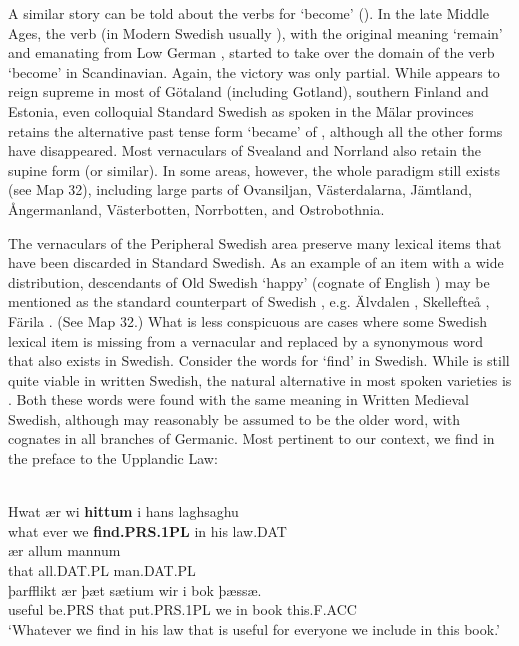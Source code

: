 A similar story can be told about the verbs for ‘become’ (\citet{Markey1969}). In the late Middle Ages, the verb (in Modern Swedish usually ), with the original meaning ‘remain’ and emanating from Low German , started to take over the domain of the verb  ‘become’ in Scandinavian. Again, the victory was only partial. While appears to reign supreme in most of Götaland (including Gotland), southern Finland and Estonia, even colloquial Standard Swedish as spoken in the Mälar provinces retains the alternative past tense form  ‘became’ of , although all the other forms have disappeared. Most vernaculars of Svealand and Norrland also retain the supine form  (or similar). In some areas, however, the whole paradigm still exists (see Map 32), including large parts of Ovansiljan, Västerdalarna, Jämtland, Ångermanland, Västerbotten, Norrbotten, and Ostrobothnia.




The vernaculars of the Peripheral Swedish area preserve many lexical items that have been discarded in Standard Swedish. As an example of an item with a wide distribution, descendants of Old Swedish ‘happy’ (cognate of English ) may be mentioned as the standard counterpart of Swedish , e.g. Älvdalen , Skellefteå , Färila . (See Map 32.) What is less conspicuous are cases where some Swedish lexical item is missing from a vernacular and replaced by a synonymous word that also exists in Swedish. Consider the words for ‘find’ in Swedish. While is still quite viable in written Swedish, the natural alternative in most spoken varieties is . Both these words were found with the same meaning in Written Medieval Swedish, although  may reasonably be assumed to be the older word, with cognates in all branches of Germanic. Most pertinent to our context, we find  in the preface to the Upplandic Law:



\ea\label{}
\\
\gll Hwat  ær  wi  \textbf{hittum} i  hans  laghsaghu\\
what  ever  we  \textbf{find.PRS.1PL} in  his  law.DAT\\
\gll ær  allum  mannum\\
that  all.DAT.PL  man.DAT.PL\\
\gll þarfflikt  ær  þæt  sætium  wir  i  bok  þæssæ.\\
useful  be.PRS  that  put.PRS.1PL  we  in  book  this.F.ACC\\
\glt ‘Whatever we find in his law that is useful for everyone we include in this book.’
\z

